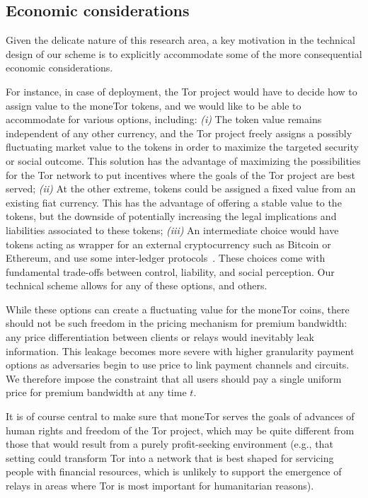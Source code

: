\subsection{Economic considerations}

Given the delicate nature of this research area, a key motivation in the technical design of our scheme is to explicitly accommodate some of the more consequential economic considerations.

For instance, in case of deployment, the Tor project would have to decide how to assign value to the moneTor tokens, and we would like to be able to accommodate for various options, including: \emph{(i)} The token value remains independent of any other currency, and the Tor project freely assigns a possibly fluctuating market value to the tokens in order to maximize the targeted security or social outcome.
This solution has the advantage of maximizing the possibilities for the Tor network to put incentives where the goals of the Tor project are best served; \emph{(ii)} At the other extreme, tokens could be assigned a fixed value from an existing fiat currency.
This has the advantage of offering a stable value to the tokens, but the downside of potentially increasing the legal implications and liabilities associated to these tokens; \emph{(iii)} An intermediate choice would have tokens acting as wrapper for an external cryptocurrency such as Bitcoin or Ethereum, and use some inter-ledger protocols~\cite{back2014enabling,poon2017plasma}.
These choices come with fundamental trade-offs between control, liability, and social perception.
Our technical scheme allows for any of these options, and others.

While these options can create a fluctuating value for the moneTor coins, there should not be such freedom in the pricing mechanism for premium bandwidth: any price differentiation between clients or relays would inevitably leak information.
This leakage becomes more severe with higher granularity payment options as adversaries begin to use price to link payment channels and circuits.
We therefore impose the constraint that all users should pay a single uniform price for premium bandwidth at any time $t$.

It is of course central to make sure that moneTor serves the goals of advances of human rights and freedom of the Tor project, which may be quite different from those that would result from a purely profit-seeking environment (e.g., that setting could transform Tor into a network that is best shaped for servicing people with financial resources, which is unlikely to support the emergence of relays in areas where Tor is most important for humanitarian reasons).

